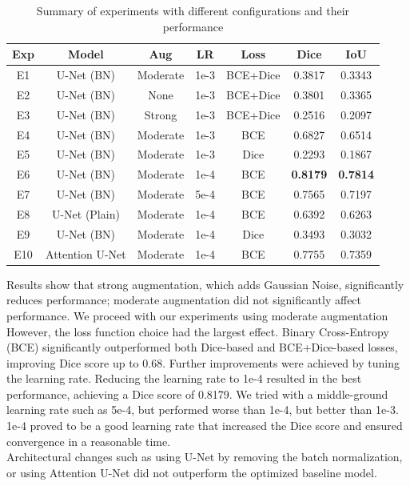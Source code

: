 \documentclass[12pt]{article}
\begin{document}
\begin{table}[H]
\centering
\begin{tabular}{|c|c|c|c|c|c|c|}
\hline
\textbf{Exp} & \textbf{Model} & \textbf{Aug} & \textbf{LR} & \textbf{Loss} & \textbf{Dice} & \textbf{IoU} \\
\hline
E1 & U-Net (BN) & Moderate & 1e-3 & BCE+Dice & 0.3817 & 0.3343 \\
E2 & U-Net (BN) & None & 1e-3 & BCE+Dice & 0.3801 & 0.3365 \\
E3 & U-Net (BN) & Strong & 1e-3 & BCE+Dice & 0.2516 & 0.2097 \\
E4 & U-Net (BN) & Moderate & 1e-3 & BCE & 0.6827 & 0.6514 \\
E5 & U-Net (BN) & Moderate & 1e-3 & Dice & 0.2293 & 0.1867 \\
E6 & U-Net (BN) & Moderate & 1e-4 & BCE & \textbf{0.8179} & \textbf{0.7814} \\
E7 & U-Net (BN) & Moderate & 5e-4 & BCE & 0.7565 & 0.7197 \\
E8 & U-Net (Plain) & Moderate & 1e-4 & BCE & 0.6392 & 0.6263 \\
E9 & U-Net (BN) & Moderate & 1e-4 & Dice & 0.3493 & 0.3032 \\
E10 & Attention U-Net & Moderate & 1e-4 & BCE & 0.7755 & 0.7359 \\
\hline
\end{tabular}
\caption{Summary of experiments with different configurations and their performance}
\label{tab:results}
\end{table}

Results show that strong augmentation, which adds Gaussian Noise, significantly reduces performance; moderate augmentation did not significantly affect performance. We proceed with our experiments using moderate augmentation\\

However, the loss function choice had the largest effect. Binary Cross-Entropy (BCE) significantly outperformed both Dice-based and BCE+Dice-based losses, improving Dice score up to 0.68. Further improvements were achieved by tuning the learning rate. Reducing the learning rate to 1e-4 resulted in the best performance, achieving a Dice score of 0.8179. We tried with a middle-ground learning rate such as 5e-4, but performed worse than 1e-4, but better than 1e-3. 1e-4 proved to be a good learning rate that increased the Dice score and ensured convergence in a reasonable time.\\

Architectural changes such as using U-Net by removing the batch normalization, or using Attention U-Net did not outperform the optimized baseline model. \\
\end{document}
